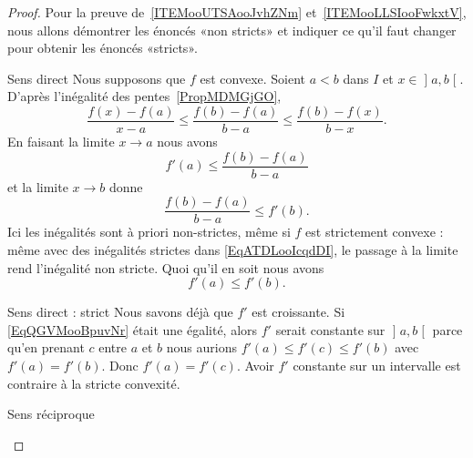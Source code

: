 \begin{proof}
    Pour la preuve de~\ref{ITEMooUTSAooJvhZNm} et~\ref{ITEMooLLSIooFwkxtV}, nous allons démontrer les énoncés «non stricts»  et indiquer ce qu'il faut changer pour obtenir les énoncés «stricts».
    \begin{subproof}
    \item[Sens direct]
        Nous supposons que \( f\) est convexe. Soient \( a<b\) dans \( I\) et \( x\in\mathopen] a , b \mathclose[\). D'après l'inégalité des pentes~\ref{PropMDMGjGO},
        \begin{equation}        \label{EqATDLooIcqdDI}
            \frac{ f(x)-f(a) }{ x-a }\leq\frac{ f(b)-f(a) }{ b-a }\leq \frac{ f(b)-f(x) }{ b-x }.
        \end{equation}
        En faisant la limite \( x\to a\) nous avons
        \begin{equation}
            f'(a)\leq \frac{ f(b)-f(a) }{ b-a }
        \end{equation}
        et la limite \( x\to b\) donne
        \begin{equation}
            \frac{ f(b)-f(a) }{ b-a }\leq f'(b).
        \end{equation}
        Ici les inégalités sont à priori non-strictes, même si \( f\) est strictement convexe : même avec des inégalités strictes dans \eqref{EqATDLooIcqdDI}, le passage à la limite rend l'inégalité non stricte. Quoi qu'il en soit nous avons
        \begin{equation}        \label{EqQGVMooBpuvNr}
            f'(a)\leq f'(b).
        \end{equation}
    \item[Sens direct : strict]
         Nous savons déjà que \( f'\) est croissante. Si \eqref{EqQGVMooBpuvNr} était une égalité, alors \( f'\) serait constante sur \( \mathopen] a , b \mathclose[\) parce qu'en prenant \( c\) entre \( a\) et \( b\) nous aurions \( f'(a)\leq f'(c)\leq f'(b)\) avec \( f'(a)=f'(b)\). Donc \( f'(a)=f'(c)\). Avoir \( f'\) constante sur un intervalle est contraire à la stricte convexité.

    \item[Sens réciproque]


\end{subproof}
\end{proof}
